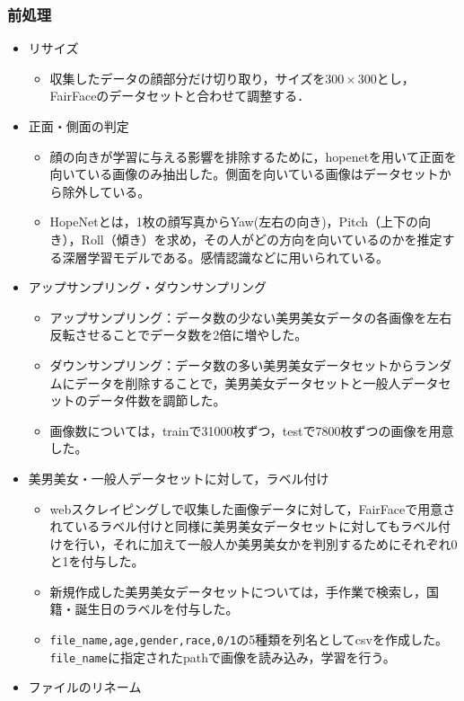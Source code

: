 \documentclass[a4paper,11pt,titlepage]{jsarticle}
\begin{document}
\subsubsection{前処理}
\begin{itemize}
    \item リサイズ
        \begin{itemize}
            \item 収集したデータの顔部分だけ切り取り，サイズを$300 \times 300$とし，FairFaceのデータセットと合わせて調整する．
        \end{itemize}
    \item 正面・側面の判定
        \begin{itemize}
            \item 顔の向きが学習に与える影響を排除するために，hopenetを用いて正面を向いている画像のみ抽出した。側面を向いている画像はデータセットから除外している。
            \item HopeNetとは，1枚の顔写真からYaw(左右の向き)，Pitch（上下の向き），Roll（傾き）を求め，その人がどの方向を向いているのかを推定する深層学習モデルである。感情認識などに用いられている。
        \end{itemize}
    \item アップサンプリング・ダウンサンプリング
        \begin{itemize}
            \item アップサンプリング：データ数の少ない美男美女データの各画像を左右反転させることでデータ数を2倍に増やした。
            \item ダウンサンプリング：データ数の多い美男美女データセットからランダムにデータを削除することで，美男美女データセットと一般人データセットのデータ件数を調節した。
            \item 画像数については，trainで31000枚ずつ，testで7800枚ずつの画像を用意した。
        \end{itemize}
    \item 美男美女・一般人データセットに対して，ラベル付け
        \begin{itemize}
            \item webスクレイピングしで収集した画像データに対して，FairFaceで用意されているラベル付けと同様に美男美女データセットに対してもラベル付けを行い，それに加えて一般人か美男美女かを判別するためにそれぞれ0と1を付与した。
            \item 新規作成した美男美女データセットについては，手作業で検索し，国籍・誕生日のラベルを付与した。
            \item \texttt{file\_name,age,gender,race,0/1}の5種類を列名としてcsvを作成した。\texttt{file\_name}に指定されたpathで画像を読み込み，学習を行う。
        \end{itemize}
    \item ファイルのリネーム
\end{itemize}
\end{document}
